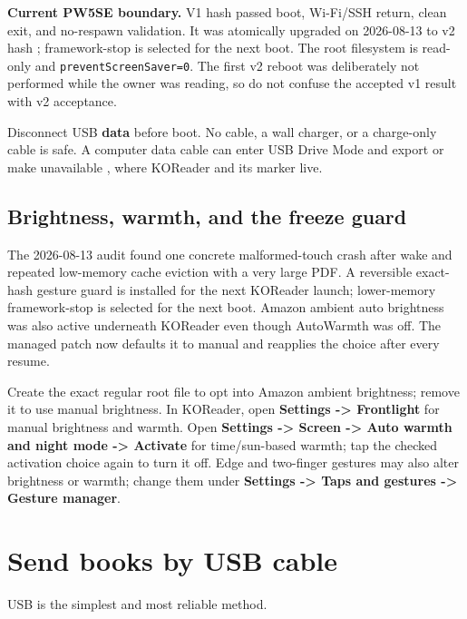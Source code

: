 \documentclass[10pt,letterpaper]{article}
\newcommand{\menupath}[1]{\textsf{\textbf{#1}}}
\newcommand{\fileloc}[1]{\path{#1}}
\begin{document}
\begin{warningbox}
\textbf{Current PW5SE boundary.} V1 hash  passed boot, Wi-Fi/SSH return, clean exit, and no-respawn validation. It was atomically upgraded on 2026-08-13 to v2 hash ; framework-stop is selected for the next boot. The root filesystem is read-only and \texttt{preventScreenSaver=0}. The first v2 reboot was deliberately not performed while the owner was reading, so do not confuse the accepted v1 result with v2 acceptance.
\end{warningbox}

Disconnect USB \textbf{data} before boot. No cable, a wall charger, or a charge-only cable is safe. A computer data cable can enter USB Drive Mode and export or make unavailable , where KOReader and its marker live.

\subsection{Brightness, warmth, and the freeze guard}

The 2026-08-13 audit found one concrete malformed-touch crash after wake and repeated low-memory cache eviction with a very large PDF. A reversible exact-hash gesture guard is installed for the next KOReader launch; lower-memory framework-stop is selected for the next boot. Amazon ambient auto brightness was also active underneath KOReader even though AutoWarmth was off. The managed patch now defaults it to manual and reapplies the choice after every resume.

Create the exact regular root file \fileloc{ENABLE_AMAZON_AUTO_BRIGHTNESS} to opt into Amazon ambient brightness; remove it to use manual brightness. In KOReader, open \menupath{Settings -> Frontlight} for manual brightness and warmth. Open \menupath{Settings -> Screen -> Auto warmth and night mode -> Activate} for time/sun-based warmth; tap the checked activation choice again to turn it off. Edge and two-finger gestures may also alter brightness or warmth; change them under \menupath{Settings -> Taps and gestures -> Gesture manager}.

\section{Send books by USB cable}

USB is the simplest and most reliable method.
\end{document}

